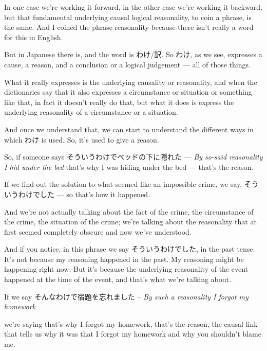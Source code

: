 In one case we're working it forward, in the other case we're working it backward, but that fundamental underlying causal logical reasonality, to coin a phrase, is the same. And I coined the phrase reasonality because there isn't really a word for this in English.

But in Japanese there is, and the word is わけ/訳. So わけ, as we see, expresses a cause, a reason, and a conclusion or a logical judgement --- all of those things.

What it really expresses is the underlying causality or reasonality, and when the dictionaries say that it also expresses a circumstance or situation or something like that, in fact it doesn't really do that, but what it does is express the underlying reasonality of a circumstance or a situation.

And once we understand that, we can start to understand the different ways in which わけ is used. So, it's used to give a reason.

\stopsectionlevel

\startsectionlevel[title={そういうわけ},reference={そういうわけ}]

So, if someone says そういうわけでベッドの下に隠れた --- {\em By so-said reasonality I hid under the bed} that's why I was hiding under the bed --- that's the reason.

{}

If we find out the solution to what seemed like an impossible crime, we say, そういうわけでした --- so that's how it happened.

{}

And we're not actually talking about the fact of the crime, the circumstance of the crime, the situation of the crime; we're talking about the reasonality that at first seemed completely obscure and now we've understood.

And if you notice, in this phrase we say そういうわけでした, in the past tense. It's not because my reasoning happened in the past. My reasoning might be happening right now. But it's because the underlying reasonality of the event happened at the time of the event, and that's what we're talking about.

If we say そんなわけで宿題を忘れました -- {\em By such a reasonality I forgot my homework}

{}

we're saying that's why I forgot my homework, that's the reason, the causal link that tells us why it was that I forgot my homework and why you shouldn't blame me.

